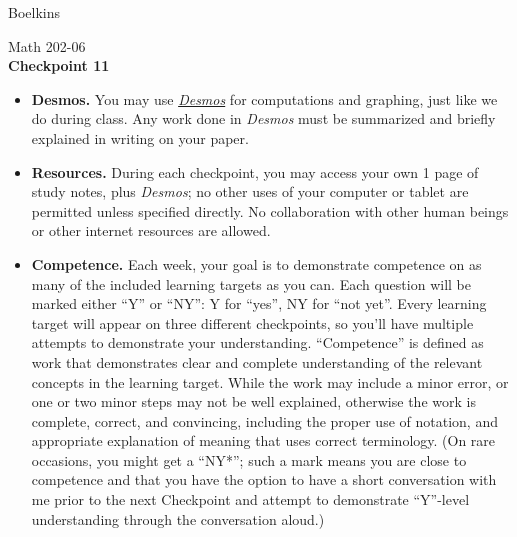 \documentclass[11 pt]{article}
\begin{document}
 \hfill Boelkins \\
 
\begin{center}
Math 202-06 \\
{\bf Checkpoint 11}
\end{center}



\begin{itemize}
	
	\item {\bf Desmos.} You may use \href{https://www.desmos.com/calculator}{\emph{Desmos}} for computations and graphing, just like we do during class.  Any work done in \emph{Desmos} must be summarized and briefly explained in writing on your paper.  
	
	\item {\bf Resources.} During each checkpoint, you may access your own 1 page of study notes, plus \emph{Desmos}; no other uses of your computer or tablet are permitted unless specified directly.  No collaboration with other human beings or other internet resources are allowed.
	
	
	\item {\bf Competence.} Each week, your goal is to demonstrate competence on as many of the included learning targets as you can.  Each question will be marked either ``Y'' or ``NY'': Y for ``yes'', NY for ``not yet''.  Every learning target will appear on three different checkpoints, so you'll have multiple attempts to demonstrate your understanding.  ``Competence'' is defined as work that demonstrates clear and complete understanding of the relevant concepts in the learning target. While the work may include a minor error, or one or two minor steps may not be well explained, otherwise the work is complete, correct, and convincing, including the proper use of notation, and appropriate explanation of meaning that uses correct terminology.  (On rare occasions, you might get a ``NY*''; such a mark means you are close to competence and that you have the option to have a short conversation with me prior to the next Checkpoint and attempt to demonstrate ``Y''-level understanding through the conversation aloud.)	
\end{itemize}

\noindent \hrulefill \\
\end{document}
